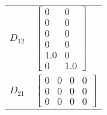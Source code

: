 \begin{tabular}{cl}
 $D_{12}$ & $\left[\begin{matrix}0 & 0\\0 & 0\\0 & 0\\0 & 0\\1.0 & 0\\0 & 1.0\end{matrix}\right]$                                                              \\
 $D_{21}$ & $\left[\begin{matrix}0 & 0 & 0 & 0\\0 & 0 & 0 & 0\\0 & 0 & 0 & 0\end{matrix}\right]$                                                               \\
\hline
\end{tabular}